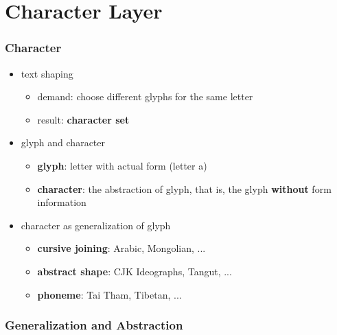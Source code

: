 \documentclass{beamer}
\begin{document}
    \section{Character Layer}

	\begin{frame}
		\frametitle{Character}
		
		\begin{itemize}
			\item text shaping
			\begin{itemize}
                \item demand: choose different glyphs for the same letter
                \item result: \textbf{character set}
            \end{itemize}
			\item glyph and character
			\begin{itemize}
				\item \textbf{glyph}: letter with actual form (letter a)
				\item \textbf{character}: the abstraction of glyph, that is, the glyph \textbf{without} form information
			\end{itemize}
            \item character as generalization of glyph
			\begin{itemize}
				\item \textbf{cursive joining}: Arabic, Mongolian, ...
				\item \textbf{abstract shape}: CJK Ideographs, Tangut, ...
				\item \textbf{phoneme}: Tai Tham, Tibetan, ...
            \end{itemize}
		\end{itemize}
	\end{frame}
	
	\begin{frame}
		\frametitle{Generalization and Abstraction}


	\end{frame}
	
\end{document}
